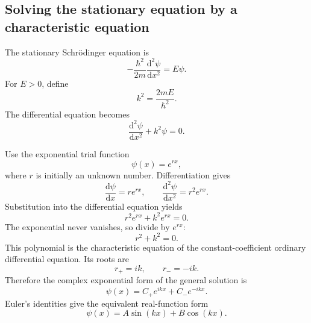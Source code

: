\subsection{Solving the stationary equation by a characteristic equation}

The stationary Schrödinger equation is
\begin{equation}
  -\frac{\hbar^2}{2m}\frac{\mathrm{d}^2\psi}{\mathrm{d}x^2}=E\psi.
\end{equation}
For \(E>0\), define
\begin{equation}
  k^2=\frac{2mE}{\hbar^2}.
\end{equation}
The differential equation becomes
\begin{equation}
  \frac{\mathrm{d}^2\psi}{\mathrm{d}x^2}+k^2\psi=0.
\end{equation}

Use the exponential trial function
\begin{equation}
  \psi(x)=e^{rx},
\end{equation}
where \(r\) is initially an unknown number. Differentiation gives
\begin{equation}
  \frac{\mathrm{d}\psi}{\mathrm{d}x}=re^{rx},
  \qquad
  \frac{\mathrm{d}^2\psi}{\mathrm{d}x^2}=r^2e^{rx}.
\end{equation}
Substitution into the differential equation yields
\begin{equation}
  r^2e^{rx}+k^2e^{rx}=0.
\end{equation}
The exponential never vanishes, so divide by \(e^{rx}\):
\begin{equation}
  r^2+k^2=0.
\end{equation}
This polynomial is the characteristic equation of the constant-coefficient
ordinary differential equation. Its roots are
\begin{equation}
  r_{+}=ik,
  \qquad
  r_{-}=-ik.
\end{equation}
Therefore the complex exponential form of the general solution is
\begin{equation}
  \psi(x)=C_{+}e^{ikx}+C_{-}e^{-ikx}.
\end{equation}
Euler's identities give the equivalent real-function form
\begin{equation}
  \psi(x)=A\sin(kx)+B\cos(kx).
\end{equation}

